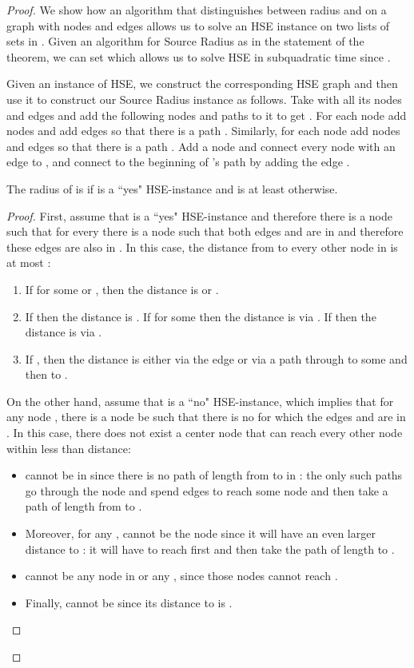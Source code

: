 \begin{proof}

We show how an algorithm that distinguishes between radius  and  on a graph with  nodes and  edges allows us to solve an HSE instance on two lists of  sets in .
Given an algorithm for Source Radius as in the statement of the theorem, we can
set  which allows us to solve HSE in subquadratic time since .

Given an instance  of HSE, we construct the corresponding HSE graph  and then use it to construct our Source Radius instance  as follows.
Take  with all its nodes and edges and add the following nodes and paths to it to get .
For each node  add  nodes  and add edges so that there is a path .
Similarly, for each node  add  nodes  and edges so that there is a path .
Add a node  and connect every node  with an  edge to , and connect  to the beginning of 's path by adding the edge .


\begin{claim}
The radius of  is  if  is a ``yes" HSE-instance and is at least  otherwise.
\end{claim}

\begin{proof}
First, assume that  is a ``yes" HSE-instance and therefore there is a node  such that for every  there is a node  such that both edges  and  are in  and therefore these edges are also in .
In this case, the distance from  to every other node  in  is at most :
\begin{enumerate} 
\item If  for some  or , then the distance is  or .
\item If  then the distance is . If  for some  then the distance is  via . If  then the distance is  via .
\item If , then the distance is either  via the edge  or  via a path through  to some  and then to .
\end{enumerate}
On the other hand, assume that  is a ``no" HSE-instance, which implies that for any node , there is a node  be such that there is no  for which the edges  and  are in . 
In this case, there does not exist a center node  that can reach every other node  within less than  distance:
\begin{itemize}
\item  cannot be in  since there is no path of length  from  to  in : the only such paths go through the node  and spend  edges to reach some node  and then take a path of length  from  to .
\item Moreover, for any ,  cannot be the node  since it will have an even larger distance to : it will have to reach  first and then take the path of length  to .
\item  cannot be any node in  or any , since those nodes cannot reach .
\item Finally,  cannot be  since its distance to  is .
\end{itemize}


\end{proof}
\end{proof}
